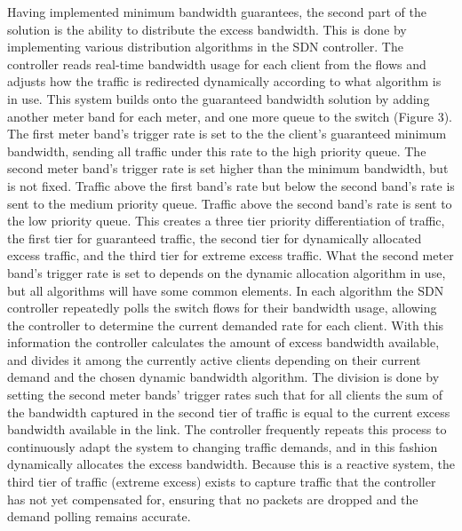 \documentclass[accepted,single]{gipaper}
\begin{document}
Having implemented minimum bandwidth guarantees, the second part of the solution is the ability to distribute the excess bandwidth. This is done by implementing various distribution algorithms in the SDN controller. The controller reads real-time bandwidth usage for each client from the flows and adjusts how the traffic is redirected dynamically according to what algorithm is in use. This system builds onto the guaranteed bandwidth solution by adding another meter band for each meter, and one more queue to the switch (Figure 3). The first meter band's trigger rate is set to the the client's guaranteed minimum bandwidth, sending all traffic under this rate to the high priority queue. The second meter band's trigger rate is set higher than the minimum bandwidth, but is not fixed. Traffic above the first band's rate but below the second band's rate is sent to the medium priority queue. Traffic above the second band's rate is sent to the low priority queue. This creates a three tier priority differentiation of traffic, the first tier for guaranteed traffic, the second tier for dynamically allocated excess traffic, and the third tier for extreme excess traffic. What the second meter band's trigger rate is set to depends on the dynamic allocation algorithm in use, but all algorithms will have some common elements. In each algorithm the SDN controller repeatedly polls the switch flows for their bandwidth usage, allowing the controller to determine the current demanded rate for each client. With this information the controller calculates the amount of excess bandwidth available, and divides it among the currently active clients depending on their current demand and the chosen dynamic bandwidth algorithm. The division is done by setting the second meter bands' trigger rates such that for all clients the sum of the bandwidth captured in the second tier of traffic is equal to the current excess bandwidth available in the link. The controller frequently repeats this process to continuously adapt the system to changing traffic demands, and in this fashion dynamically allocates the excess bandwidth. Because this is a reactive system, the third tier of traffic (extreme excess) exists to capture traffic that the controller has not yet compensated for, ensuring that no packets are dropped and the demand polling remains accurate. 
\end{document}
